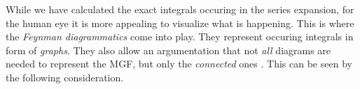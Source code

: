 While we have calculated the exact integrals occuring in the series expansion, for the human eye it is more appealing to visualize what is happening. This is where the \emph{Feynman diagrammatics} come into play. They represent occuring integrals in form of \emph{graphs}. They also allow an argumentation that not \emph{all} diagrams are needed to represent the MGF, but only the \emph{connected} ones \cite[Sec. 4.3]{Hansen_McDonald_1979}. This can be seen by the following consideration.



